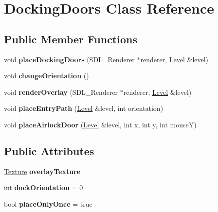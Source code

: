 \hypertarget{class_docking_doors}{}\section{Docking\+Doors Class Reference}
\label{class_docking_doors}
\subsection*{Public Member Functions}
\begin{DoxyCompactItemize}
\item 
\mbox{\label{class_docking_doors_a3e63df84955a9fbbdf0db9f30d63b60e}} 
void {\bfseries place\+Docking\+Doors} (S\+D\+L\+\_\+\+Renderer $\ast$renderer, \hyperlink{class_level}{Level} \&level)
\item 
\mbox{\label{class_docking_doors_a0cacbcddb4ba243e2e74bfbe5c51e3aa}} 
void {\bfseries change\+Orientation} ()
\item 
\mbox{\label{class_docking_doors_a17e2c587398f28d66ed57deaae79f3d8}} 
void {\bfseries render\+Overlay} (S\+D\+L\+\_\+\+Renderer $\ast$renderer, \hyperlink{class_level}{Level} \&level)
\item 
\mbox{\label{class_docking_doors_affcb5dbe205755dbbeca3ead5c0c433b}} 
void {\bfseries place\+Entry\+Path} (\hyperlink{class_level}{Level} \&level, int orientation)
\item 
\mbox{\label{class_docking_doors_a6b4075011d18f7fc8dd66d7f71e50905}} 
void {\bfseries place\+Airlock\+Door} (\hyperlink{class_level}{Level} \&level, int x, int y, int mouseY)
\end{DoxyCompactItemize}
\subsection*{Public Attributes}
\begin{DoxyCompactItemize}
\item 
\mbox{\label{class_docking_doors_a7b0ebae2b928f2a790a6c04d0fafadeb}} 
\hyperlink{class_texture}{Texture} {\bfseries overlay\+Texture}
\item 
\mbox{\label{class_docking_doors_ae7db99081fa2d5865b3dead8f41eeb0e}} 
int {\bfseries dock\+Orientation} = 0
\item 
\mbox{\label{class_docking_doors_a9d2ddca623a6798c1d820375a3d77691}} 
bool {\bfseries place\+Only\+Once} = true
\end{DoxyCompactItemize}


